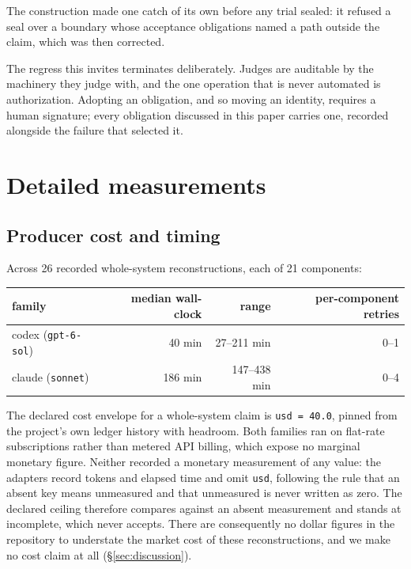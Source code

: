 The construction made one catch of its own before any trial sealed: it
refused a seal over a boundary whose acceptance obligations named a path
outside the claim, which was then corrected.

The regress this invites terminates deliberately. Judges are auditable by
the machinery they judge with, and the one operation that is never
automated is authorization. Adopting an obligation, and so moving an
identity, requires a human signature; every obligation discussed in this
paper carries one, recorded alongside the failure that selected it.

\section{Detailed measurements}
\label{app:measurements}

\subsection{Producer cost and timing}

Across 26 recorded whole-system reconstructions, each of 21 components:

\begin{center}\small
\begin{tabular}{@{}lrrr@{}}
\toprule
family & median wall-clock & range & per-component retries \\
\midrule
codex (\texttt{gpt-6-sol}) & 40 min & 27--211 min & 0--1 \\
claude (\texttt{sonnet})   & 186 min & 147--438 min & 0--4 \\
\bottomrule
\end{tabular}
\end{center}

The declared cost envelope for a whole-system claim is \texttt{usd =
40.0}, pinned from the project's own ledger history with headroom. Both
families ran on flat-rate subscriptions rather than metered API billing,
which expose no marginal monetary figure. Neither recorded a monetary
measurement of any value: the adapters record tokens and elapsed time
and omit \texttt{usd}, following the rule that an absent key means
unmeasured and that unmeasured is never written as zero. The declared
ceiling therefore compares against an absent measurement and stands at
\textsf{incomplete}, which never accepts. There are consequently no
dollar figures in the repository to understate the market cost of these
reconstructions, and we make no cost claim at all
(\S\ref{sec:discussion}).

